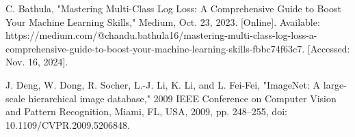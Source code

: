 \documentclass[conference]{IEEEtran}
\begin{document}
\begin{thebibliography}{00}
 C. Bathula, "Mastering Multi-Class Log Loss: A Comprehensive Guide to Boost Your Machine Learning Skills," Medium, Oct. 23, 2023. [Online]. Available: https://medium.com/@chandu.bathula16/mastering-multi-class-log-loss-a-comprehensive-guide-to-boost-your-machine-learning-skills-fbbc74f63c7. [Accessed: Nov. 16, 2024].

 J. Deng, W. Dong, R. Socher, L.-J. Li, K. Li, and L. Fei-Fei, "ImageNet: A large-scale hierarchical image database," 2009 IEEE Conference on Computer Vision and Pattern Recognition, Miami, FL, USA, 2009, pp. 248–255, doi: 10.1109/CVPR.2009.5206848. 

\end{thebibliography}

\vspace{12pt}
\color{red}
\end{document}
